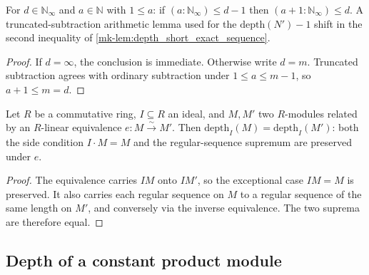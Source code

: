 \begin{lemma}\label{mk-lem:natCast_add_one_le_of_le_sub_one}
  \leanok

  For \(d \in \mathbb N_\infty\) and \(a \in \mathbb N\) with \(1 \leq a\): if
  \((a : \mathbb N_\infty) \leq d - 1\) then \((a + 1 : \mathbb N_\infty) \leq d\). A
  truncated-subtraction arithmetic lemma used for the \(\text{depth}(N') - 1\)
  shift in the second inequality of \ref{mk-lem:depth_short_exact_sequence}.
\end{lemma}
\begin{proof}
  \leanok

If \(d=\infty\), the conclusion is immediate. Otherwise write
  \(d=m\). Truncated subtraction agrees with ordinary subtraction under
  \(1\leq a\leq m-1\), so \(a+1\leq m=d\).
\end{proof}

\begin{lemma}\label{mk-lem:depth_eq_of_linearEquiv}
  \leanok

  Let \(R\) be a commutative ring, \(I \subseteq R\) an ideal, and \(M, M'\) two
  \(R\)-modules related by an \(R\)-linear equivalence \(e : M \xrightarrow{\sim} M'\).
  Then \(\text{depth}_I(M) = \text{depth}_I(M')\): both the side condition
  \(I \cdot M = M\) and the regular-sequence supremum are preserved under \(e\).
\end{lemma}
\begin{proof}
  \leanok

The equivalence carries \(I M\) onto \(I M'\), so the exceptional
  case \(IM=M\) is preserved. It also carries each regular sequence on
  \(M\) to a regular sequence of the same length on \(M'\), and conversely
  via the inverse equivalence. The two suprema are therefore equal.
\end{proof}

\subsection{Depth of a constant product module}
\label{mk-subsec:ab_depth_pi_substrate}

